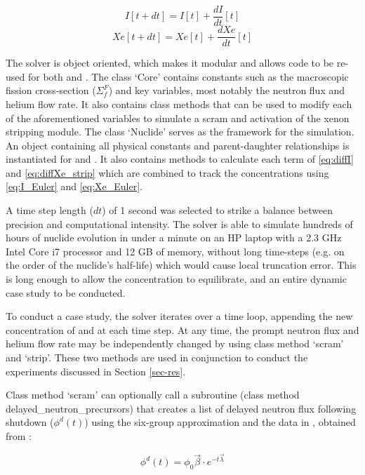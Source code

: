 \begin{equation}\label{eq:I_Euler}
    I[t+dt]=I[t]+\frac{dI}{dt}[t]
\end{equation}
\begin{equation}\label{eq:Xe_Euler}
    Xe[t+dt]=Xe[t]+\frac{dXe}{dt}[t]
\end{equation}

The solver is object oriented, which makes it modular and allows code to be re-used for both \I and \Xe. The class `Core' contains constants such as the macroscopic fission cross-section ($\Sigma_f^F$) and key variables, most notably the neutron flux and helium flow rate. It also contains class methods that can be used to modify each of the aforementioned variables to simulate a scram and activation of the xenon stripping module. The class `Nuclide' serves as the framework for the simulation. An object containing all physical constants and parent-daughter relationships is instantiated for \I and \Xe. It also contains methods to calculate each term of \ref{eq:diffI} and \ref{eq:diffXe_strip} which are combined to track the concentrations using \ref{eq:I_Euler} and \ref{eq:Xe_Euler}.


A time step length ($dt$) of 1 second was selected to strike a balance between precision and computational intensity. The solver is able to simulate hundreds of hours of nuclide evolution in under a minute on an HP laptop with a 2.3 GHz Intel Core i7 processor and 12 GB of memory, without long time-steps (e.g. on the order of the nuclide's half-life) which would cause  local truncation error. This is long enough to allow the \Xe concentration to equilibrate, and an entire dynamic case study to be conducted.

To conduct a case study, the solver iterates over a time loop, appending the new concentration of \I and \Xe at each time step.  At any time, the prompt neutron flux and helium flow rate may be independently changed by using class method `scram' and `strip'. These two methods are used in conjunction to conduct the experiments discussed in Section \ref{sec-res}.

Class method `scram' can optionally call a subroutine (class method delayed\_neutron\_precursors) that creates a list of delayed neutron flux following shutdown ($\phi^{d}(t)$) using the six-group approximation and the data in , obtained from \cite{Kerlin}:

\begin{equation}\label{eq:dn_flux}
    \phi^{d}(t) = \phi_{0} \vec{\beta} \cdot e^{-t\vec{\lambda}}
\end{equation}

